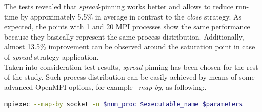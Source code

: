 The tests revealed that \textit{spread}-pinning works better and allows to reduce run-time by approximately 5.5\% in average in contrast to the \textit{close} strategy. As expected, the points with 1 and 20 MPI processes show the same performance because they basically represent the same process distribution. Additionally, almost 13.5\% improvement can be observed around the saturation point in case of \textit{spread} strategy application.\\

Taken into consideration test results, \textit{spread}-pinning has been chosen for the rest of the study. Such process distribution can be easily achieved by means of some advanced OpenMPI options, for example \textit{--map-by}, as following:. \\

\begin{lstlisting}[language=bash, caption={An example of \textit{spread}-pinning with using OpenMPI options in case of a flat-MPI run}, frame=single, label={lst:iterative-refinement}]
mpiexec --map-by socket -n $num_proc $executable_name $parameters
\end{lstlisting}
